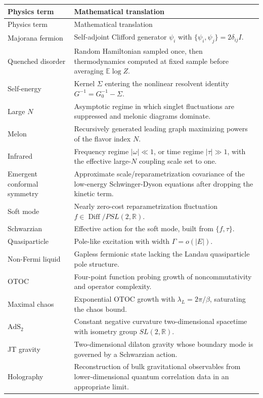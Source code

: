 \documentclass[11pt]{article}
\numberwithin{equation}{section}
\theoremstyle{exposition}
\theoremstyle{result}
\newcommand{\E}{\mathbb E}
\newcommand{\R}{\mathbb R}
\newcommand{\Diff}{\operatorname{Diff}}
\newcommand{\AdS}{\mathrm{AdS}}
\begin{document}
\begin{longtable}{@{}>{\raggedright\arraybackslash}p{}>{\raggedright\arraybackslash}p{}@{}}
\toprule
Physics term & Mathematical translation \\
\midrule
\endfirsthead
\toprule
Physics term & Mathematical translation \\
\midrule
\endhead
Majorana fermion & Self-adjoint Clifford generator $\psi_i$ with $\{\psi_i,\psi_j\}=2\delta_{ij}I$. \\
Quenched disorder & Random Hamiltonian sampled once, then thermodynamics computed at fixed sample before averaging $\E\log Z$. \\
Self-energy & Kernel $\Sigma$ entering the nonlinear resolvent identity $G^{-1}=G_0^{-1}-\Sigma$. \\
Large $N$ & Asymptotic regime in which singlet fluctuations are suppressed and melonic diagrams dominate. \\
Melon & Recursively generated leading graph maximizing powers of the flavor index $N$. \\
Infrared & Frequency regime $|\omega|\ll1$, or time regime $|\tau|\gg1$, with the effective large-$N$ coupling scale set to one. \\
Emergent conformal symmetry & Approximate scale/reparametrization covariance of the low-energy Schwinger-Dyson equations after dropping the kinetic term. \\
Soft mode & Nearly zero-cost reparametrization fluctuation $f\in\Diff/PSL(2,\R)$. \\
Schwarzian & Effective action for the soft mode, built from $\{f,\tau\}$. \\
Quasiparticle & Pole-like excitation with width $\Gamma=o(|E|)$. \\
Non-Fermi liquid & Gapless fermionic state lacking the Landau quasiparticle pole structure. \\
OTOC & Four-point function probing growth of noncommutativity and operator complexity. \\
Maximal chaos & Exponential OTOC growth with $\lambda_L=2\pi/\beta$, saturating the chaos bound. \\
$\AdS_2$ & Constant negative curvature two-dimensional spacetime with isometry group $SL(2,\R)$. \\
JT gravity & Two-dimensional dilaton gravity whose boundary mode is governed by a Schwarzian action. \\
Holography & Reconstruction of bulk gravitational observables from lower-dimensional quantum correlation data in an appropriate limit. \\
\bottomrule
\end{longtable}
\end{document}
